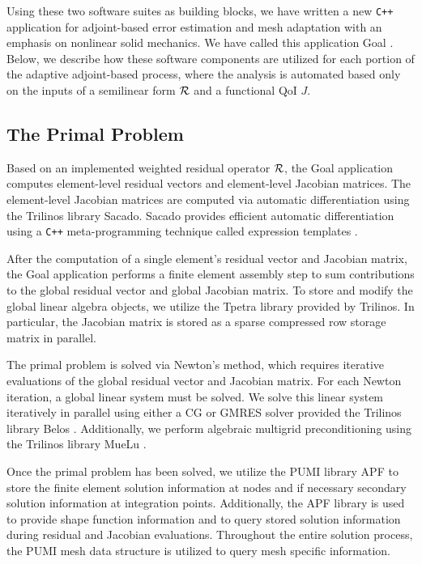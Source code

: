 Using these two software suites as building blocks, we have written a new
\texttt{C++} application for adjoint-based error estimation and mesh
adaptation with an emphasis on nonlinear solid mechanics. We have called this
application Goal \cite{goal_github}. Below, we describe
how these software components are
utilized for each portion of the adaptive adjoint-based process,
where the analysis is automated based only on the inputs of a semilinear
form $\mathcal{R}$ and a functional QoI $J$.

\subsection{The Primal Problem}

Based on an implemented weighted residual operator $\mathcal{R}$, the Goal
application computes element-level residual vectors and element-level
Jacobian matrices. The element-level Jacobian matrices are computed via
automatic differentiation using the Trilinos library Sacado. Sacado
provides efficient automatic differentiation using a \texttt{C++}
meta-programming technique called expression templates
\cite{phipps2012efficient}.

After the computation of a single element's residual vector and Jacobian
matrix, the Goal application performs a finite element assembly step to
sum contributions to the global residual vector and global Jacobian matrix.
To store and modify the global linear algebra objects, we utilize the Tpetra
library provided by Trilinos. In particular, the Jacobian matrix is stored
as a sparse compressed row storage matrix in parallel.

The primal problem is solved via Newton's method, which requires iterative
evaluations of the global residual vector and Jacobian matrix. For each
Newton iteration, a global linear system must be solved. We solve
this linear system iteratively in parallel using either a CG or GMRES solver provided
the Trilinos library Belos \cite{bavier2012amesos2}. Additionally, we
perform algebraic multigrid preconditioning using the Trilinos library
MueLu \cite{MueLu}.

Once the primal problem has been solved, we utilize the PUMI library APF
to store the finite element solution information at nodes and if necessary
secondary solution information at integration points. Additionally, the APF
library is used to provide shape function information and to query stored
solution information during residual and Jacobian evaluations. Throughout
the entire solution process, the PUMI mesh data structure is utilized to
query mesh specific information.

